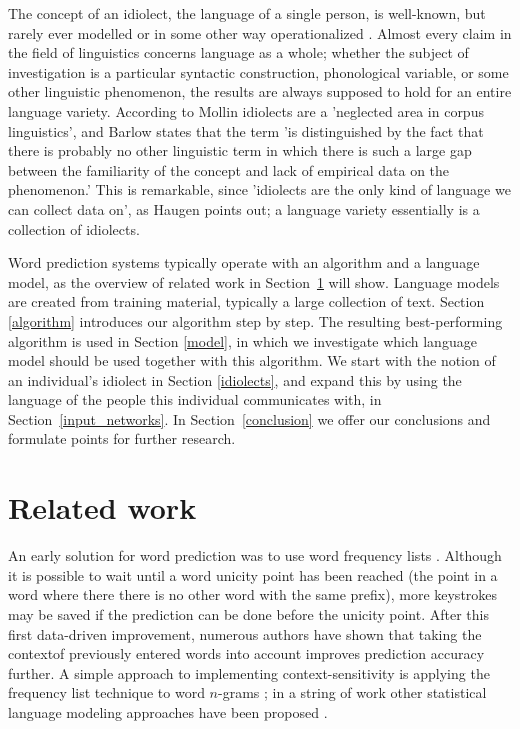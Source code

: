 \documentclass[11pt]{article}
\begin{document}
The concept of an idiolect, the language of a single person, is well-known, but rarely ever modelled or in some other way operationalized \cite{mollin09,barlow10,louwerse04}. Almost every claim in the field of linguistics concerns language as a whole; whether the subject of investigation is a particular syntactic construction, phonological variable, or some other linguistic phenomenon, the results are always supposed to hold for an entire language variety. According to Mollin  idiolects are a 'neglected area in corpus linguistics', and Barlow  states that the term 'is distinguished by the fact that there is probably no other linguistic term in which there is such a large gap between the familiarity of the concept and lack of empirical data on the phenomenon.' This is remarkable, since 'idiolects are the only kind of language we can collect data on', as Haugen  points out; a language variety essentially is a collection of idiolects.

Word prediction systems typically operate with an algorithm and a language model, as the overview of related work in Section~\ref{related} will show. Language models are created from training material, typically a large collection of text. Section \ref{algorithm} introduces our algorithm step by step. The resulting best-performing algorithm is used in Section \ref{model}, in which we investigate which language model should be used together with this algorithm. We start with the notion of an individual's idiolect in Section \ref{idiolects}, and expand this by using the language of the people this individual communicates with, in Section~\ref{input_networks}. In Section~\ref{conclusion} we offer our conclusions and formulate points for further research.

\section{Related work}
\label{related}

An early solution for word prediction was to use word frequency lists \cite{swiffin+85}. Although it is possible to wait until a word unicity point has been reached (the point in a word where there there is no other word with the same prefix), more keystrokes may be saved if the prediction can be done before the unicity point. After this first data-driven improvement, numerous authors have shown that taking the contextof previously entered words into account improves prediction accuracy further. A simple approach to implementing context-sensitivity is applying the frequency list technique to word $n$-grams \cite{hunnicutt87}; in a string of work other statistical language modeling approaches have been proposed \cite{Lesher+99,Langlais+00,Garay-Vitoria+06,Tanaka-Ishii07,vandenbosch+08}. 
\end{document}
